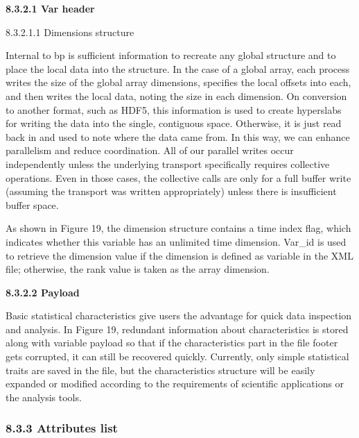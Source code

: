 \vspace{10pt}
\textbf{8.3.2.1 Var header}

\vspace{10pt}
{\color{color17} 8.3.2.1.1 Dimensions structure}

\vspace{10pt}
Internal to bp is sufficient information to recreate any global structure and to 
place the local data into the structure. In the case of a global array, each process 
writes the size of the global array dimensions, specifies the local offsets into 
each, and then writes the local data, noting the size in each dimension. On conversion 
to another format, such as HDF5, this information is used to create hyperslabs 
for writing the data into the single, contiguous space. Otherwise, it is just read 
back in and used to note where the data came from. In this way, we can enhance 
parallelism and reduce coordination. All of our parallel writes occur independently 
unless the underlying transport specifically requires collective operations. Even 
in those cases, the collective calls are only for a full buffer write (assuming 
the transport was written appropriately) unless there is insufficient buffer space. 

\vspace{10pt}
As shown in Figure 19, the dimension structure contains a time index flag, which 
indicates whether this variable has an unlimited time dimension. Var\_id is used 
to retrieve the dimension value if the dimension is defined as variable in the 
XML file; otherwise, the rank value is taken as the array dimension.  

\vspace{10pt}
\textbf{8.3.2.2 Payload}

\vspace{10pt}
Basic statistical characteristics give users the advantage for quick data inspection 
and analysis. In Figure 19, redundant information about characteristics is stored 
along with variable payload so that if the characteristics part in the file footer 
gets corrupted, it can still be recovered quickly. Currently, only simple statistical 
traits are saved in the file, but the characteristics structure will be easily 
expanded or modified according to the requirements of scientific applications or 
the analysis tools. \label{HToc84890277}\label{HToc212016653}\label{HToc212016895}\label{HToc182553424}

\vspace{10pt}
\subsubsection*{{\large \textbf{8.3.3 Attributes list}}}

